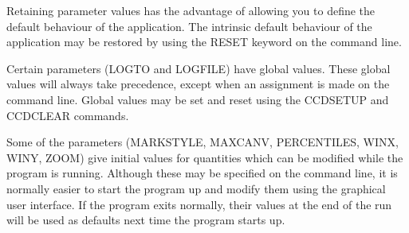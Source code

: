 \documentclass[twoside,11pt]{article}
\newcommand{\htmlref}[2]{#1}
\renewcommand{\_}{\texttt{\symbol{95}}}
\newcommand{\xroutine}[1]{\htmlref{{\sc #1}}{#1}}
\begin{document}
{{      Retaining parameter values has the advantage of allowing you to
      define the default behaviour of the application.  The intrinsic
      default behaviour of the application may be restored by using the
      RESET keyword on the command line.

      Certain parameters (LOGTO and LOGFILE) have global values. These
      global values will always take precedence, except when an
      assignment is made on the command line.  Global values may be set
      and reset using the \xroutine{CCDSETUP} and \xroutine{CCDCLEAR} commands.

      Some of the parameters (MARKSTYLE, MAXCANV, PERCENTILES, WINX, WINY, ZOOM)
      give initial values for quantities which can be modified while
      the program is running.  Although these may be specified on the
      command line, it is normally easier to start the program up and
      modify them using the graphical user interface.  If the program
      exits normally, their values at the end of the run will be used
      as defaults next time the program starts up.
   }
}
\end{document}
